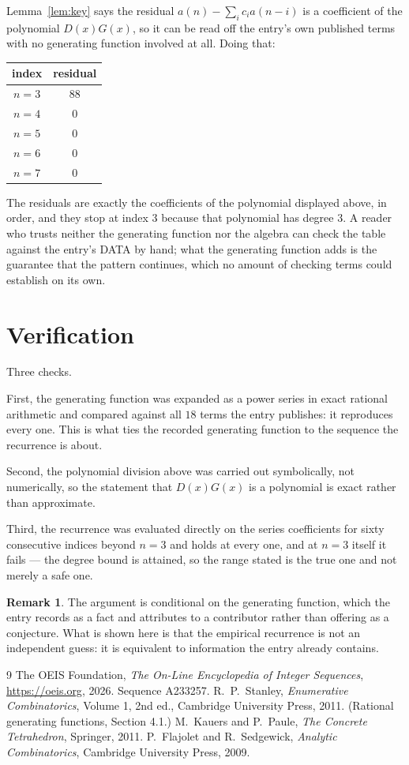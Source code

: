\documentclass[11pt,a4paper]{article}
\theoremstyle{plain}
\theoremstyle{definition}
\newtheorem{remark}[theorem]{Remark}
\begin{document}
Lemma~\ref{lem:key} says the residual $a(n)-\sum_ic_ia(n-i)$ is a coefficient of the
polynomial $D(x)G(x)$, so it can be read off the entry's own published terms with no
generating function involved at all. Doing that:
\begin{center}
\begin{tabular}{cc}
index & residual \\ \hline
$n=3$ & $88$ \\
$n=4$ & $0$ \\
$n=5$ & $0$ \\
$n=6$ & $0$ \\
$n=7$ & $0$
\end{tabular}
\end{center}
The residuals are exactly the coefficients of the polynomial displayed above, in order, and
they stop at index $3$ because that polynomial has degree $3$. A reader who trusts
neither the generating function nor the algebra can check the table against the entry's DATA
by hand; what the generating function adds is the guarantee that the pattern continues, which
no amount of checking terms could establish on its own.

\section{Verification}

Three checks.

First, the generating function was expanded as a power series in exact rational arithmetic and
compared against all $18$ terms the entry publishes: it reproduces every one. This is
what ties the recorded generating function to the sequence the recurrence is about.

Second, the polynomial division above was carried out symbolically, not numerically, so the
statement that $D(x)G(x)$ is a polynomial is exact rather than approximate.

Third, the recurrence was evaluated directly on the series coefficients for sixty consecutive
indices beyond $n=3$ and holds at every one, and at $n=3$ itself it fails --- the
degree bound is attained, so the range stated is the true one and not merely a safe one.

\begin{remark}
The argument is conditional on the generating function, which the entry records as a fact and
attributes to a contributor rather than offering as a conjecture. What is shown here is that
the empirical recurrence is not an independent guess: it is equivalent to information the
entry already contains.
\end{remark}

\begin{thebibliography}{9}
 The OEIS Foundation, \emph{The On-Line Encyclopedia of Integer
Sequences}, \url{https://oeis.org}, 2026. Sequence A233257.
 R.~P.~Stanley, \emph{Enumerative Combinatorics}, Volume 1, 2nd ed.,
Cambridge University Press, 2011. (Rational generating functions, Section 4.1.)
 M.~Kauers and P.~Paule, \emph{The Concrete Tetrahedron}, Springer, 2011.
 P.~Flajolet and R.~Sedgewick, \emph{Analytic Combinatorics}, Cambridge
University Press, 2009.
\end{thebibliography}
\end{document}
